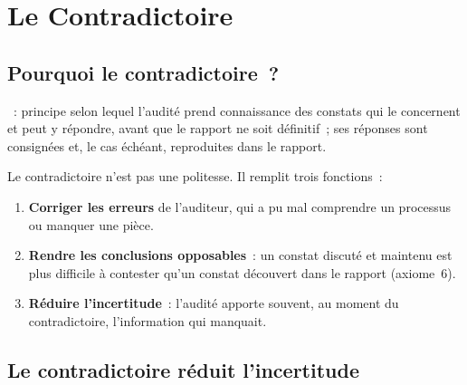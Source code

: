 \section{Le Contradictoire}
\label{sec:c05-contradictoire}

\subsection{Pourquoi le contradictoire~?}

\begin{boxdef}
~: principe selon lequel
l'audité prend connaissance des constats qui le concernent et peut y
répondre, avant que le rapport ne soit définitif~; ses réponses sont
consignées et, le cas échéant, reproduites dans le rapport.
\end{boxdef}

Le contradictoire n'est pas une politesse. Il remplit trois fonctions~:
\begin{enumerate}
    \item \textbf{Corriger les erreurs} de l'auditeur, qui a pu mal
          comprendre un processus ou manquer une pièce.
    \item \textbf{Rendre les conclusions opposables}~: un constat discuté et
          maintenu est plus difficile à contester qu'un constat découvert
          dans le rapport (axiome~6).
    \item \textbf{Réduire l'incertitude}~: l'audité apporte souvent, au
          moment du contradictoire, l'information qui manquait.
\end{enumerate}

\subsection{Le contradictoire réduit l'incertitude}

